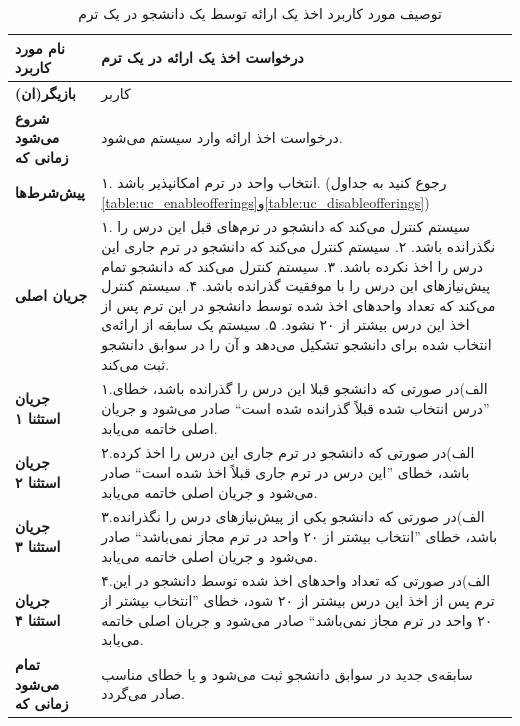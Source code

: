 \begin{table}
\begin{center}
\begin{tabular}{|p{4cm}|p{12cm}|}
	\hline
	\textbf{نام مورد کاربرد} &
درخواست اخذ یک ارائه در یک ترم\\
	\hline
	\textbf{بازیگر(ان)} &
کاربر\\
	\hline
	\textbf{شروع می‌شود زمانی که} &
درخواست اخذ ارائه وارد سیستم می‌شود.\\
	\hline
	\textbf{پیش‌شرط‌ها} &
۱. ‌انتخاب واحد در ترم امکانپذیر باشد. (رجوع کنید به جداول \ref{table:uc_enableofferings}و\ref{table:uc_disableofferings})\\
	\hline
	\textbf{جریان اصلی} &
۱. سیستم کنترل می‌کند که دانشجو در ترم‌های قبل این درس را نگذرانده باشد.\newline
۲. سیستم کنترل می‌کند که دانشجو در ترم‌ جاری این درس را اخذ نکرده باشد.\newline
۳. سیستم کنترل می‌کند که دانشجو تمام پیش‌نیاز‌های این درس را با موفقیت گذرانده باشد.\newline
۴. سیستم کنترل می‌کند که تعداد واحد‌های اخذ شده توسط دانشجو در این ترم پس از اخذ این درس بیشتر از ۲۰ نشود.\newline
۵. سیستم یک سابقه از ارائه‌ی انتخاب شده برای دانشجو تشکیل می‌دهد و آن را در سوابق دانشجو ثبت می‌کند.\\
	\hline
\textbf{جریان استثنا ۱} &
۱.الف)در صورتی که دانشجو قبلا این درس را گذرانده باشد، خطای ''درس انتخاب شده قبلاً گذرانده شده است`` صادر می‌شود و جریان اصلی خاتمه می‌یابد.\\
	\hline
\textbf{جریان استثنا ۲} &
۲.الف)در صورتی که دانشجو در ترم جاری این درس را اخذ کرده باشد، خطای ''این درس در ترم جاری قبلاً اخذ شده است`` صادر می‌شود و جریان اصلی خاتمه می‌یابد.\\
	\hline
\textbf{جریان استثنا ۳} &
۳.الف)در صورتی که دانشجو یکی از پیش‌نیاز‌های درس‌ را نگذرانده باشد، خطای ''انتخاب بیشتر از ۲۰ واحد در ترم مجاز نمی‌باشد`` صادر می‌شود و جریان اصلی خاتمه می‌یابد.\\
	\hline
\textbf{جریان استثنا ۴} &
۴.الف)در صورتی که تعداد واحد‌های اخذ شده توسط دانشجو در این ترم پس از اخذ این درس بیشتر از ۲۰ شود، خطای ''انتخاب بیشتر از ۲۰ واحد در ترم مجاز نمی‌باشد`` صادر می‌شود و جریان اصلی خاتمه می‌یابد.\\
	\hline
	\textbf{تمام می‌شود زمانی که} &
سابقه‌ی جدید در سوابق دانشجو ثبت می‌شود و یا خطای مناسب صادر می‌گردد.\\
	\hline
\end{tabular}
\caption{\label{table:uc_takecoure} توصیف مورد کاربرد اخذ یک ارائه توسط یک دانشجو در یک ترم}
\end{center}
\end{table}

